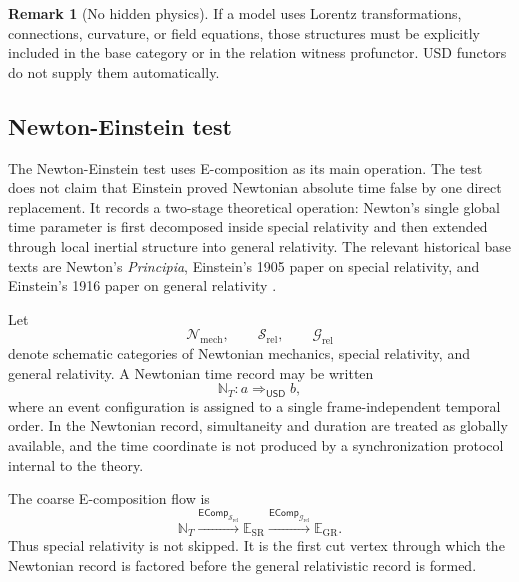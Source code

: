 \documentclass[11pt]{article}
\newcommand{\USD}{\mathsf{USD}}
\newcommand{\EComp}{\mathsf{EComp}}
\theoremstyle{definition}
\newtheorem{remark}[definition]{Remark}
\theoremstyle{plain}
\begin{document}
\begin{remark}[No hidden physics]
If a model uses Lorentz transformations, connections, curvature, or field
equations, those structures must be explicitly included in the base
category or in the relation witness profunctor.  USD functors do not
supply them automatically.
\end{remark}

\subsection{Newton-Einstein test}

The Newton-Einstein test uses E-composition as its main operation.  The
test does not claim that Einstein proved Newtonian absolute time false by
one direct replacement.  It records a two-stage theoretical operation:
Newton's single global time parameter is first decomposed inside special
relativity and then extended through local inertial structure into
general relativity.  The relevant historical base texts are Newton's
\emph{Principia}, Einstein's 1905 paper on special relativity, and
Einstein's 1916 paper on general relativity
\cite{Newton1687,Einstein1905,Einstein1916}.

Let
\[
  \mathcal N_{\mathrm{mech}},
  \qquad
  \mathcal S_{\mathrm{rel}},
  \qquad
  \mathcal G_{\mathrm{rel}}
\]
denote schematic categories of Newtonian mechanics, special relativity,
and general relativity.  A Newtonian time record may be written
\[
  \mathbb N_T:a\Rightarrow_{\USD} b,
\]
where an event configuration is assigned to a single frame-independent
temporal order.  In the Newtonian record, simultaneity and duration are
treated as globally available, and the time coordinate is not produced by
a synchronization protocol internal to the theory.

The coarse E-composition flow is
\[
  \mathbb N_T
  \xrightarrow{\EComp_{\mathcal S_{\mathrm{rel}}}}
  \mathbb E_{\mathrm{SR}}
  \xrightarrow{\EComp_{\mathcal G_{\mathrm{rel}}}}
  \mathbb E_{\mathrm{GR}}.
\]
Thus special relativity is not skipped.  It is the first cut vertex
through which the Newtonian record is factored before the general
relativistic record is formed.
\end{document}

